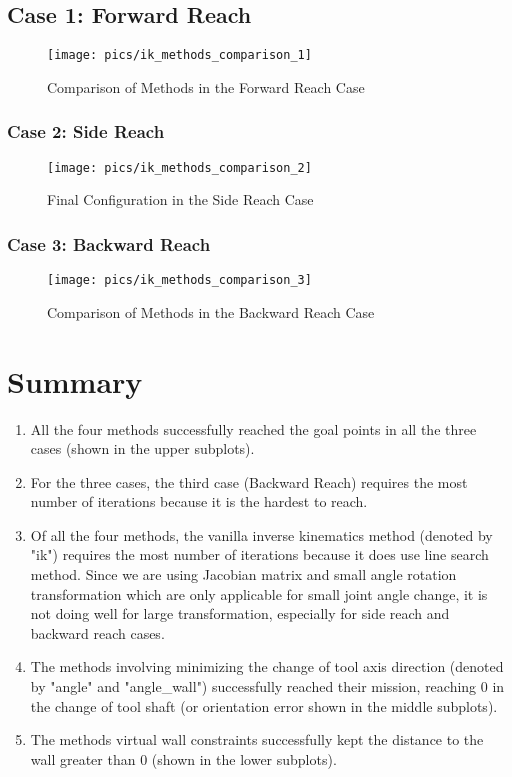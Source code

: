 \documentclass[english,10pt,a4paper]{book}
\begin{document}
		\subsection{Case 1: Forward Reach}
		\begin{figure}[H]
			\centering
			\texttt{[image: pics/ik\_methods\_comparison\_1]}
			\caption{Comparison of Methods in the Forward Reach Case}
		\end{figure}
		\subsubsection{Case 2: Side Reach}
		\begin{figure}[H]
			\centering
			\texttt{[image: pics/ik\_methods\_comparison\_2]}
			\caption{Final Configuration in the Side Reach Case}
		\end{figure}
		\subsubsection{Case 3: Backward Reach}
		\begin{figure}[H]
			\centering
			\texttt{[image: pics/ik\_methods\_comparison\_3]}
			\caption{Comparison of Methods in the Backward Reach Case}
		\end{figure}
		\section{Summary}
		\begin{enumerate}
			\item All the four methods successfully reached the goal points in all the three cases (shown in the upper subplots).
			\item For the three cases, the third case (Backward Reach) requires the most number of iterations because it is the hardest to reach.
			\item Of all the four methods, the vanilla inverse kinematics method (denoted by "ik") requires the most number of iterations because it does use line search method. Since we are using Jacobian matrix and small angle rotation transformation which are only applicable for small joint angle change, it is not doing well for large transformation, especially for side reach and backward reach cases.
			\item The methods involving minimizing the change of tool axis direction (denoted by "angle" and "angle\_wall") successfully reached their mission, reaching 0 in the change of tool shaft (or orientation error shown in the middle subplots).
			\item The methods virtual wall constraints successfully kept the distance to the wall greater than 0 (shown in the lower subplots).
		\end{enumerate}
		
    \printbibliography
\end{document}

